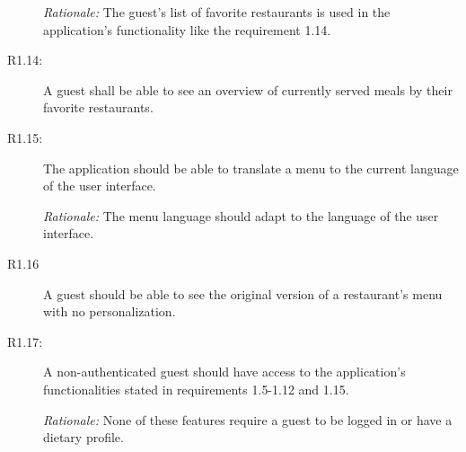 \begin{description}
    \emph{Rationale:} The guest's list of favorite restaurants is used in the application's functionality like the requirement 1.14.
    \item [R1.14:] A guest shall be able to see an overview of currently served meals by their favorite restaurants.
    \item [R1.15:] The application should be able to translate a menu to the current language of the user interface.

    \emph{Rationale:} The menu language should adapt to the language of the user interface.
    \item [R1.16] A guest should be able to see the original version of a restaurant's menu with no personalization.
    \item [R1.17:] A non-authenticated guest should have access to the application's functionalities stated in requirements 1.5-1.12 and 1.15.  
    
    \emph{Rationale:} None of these features require a guest to be logged in or have a dietary profile.
\end{description}

